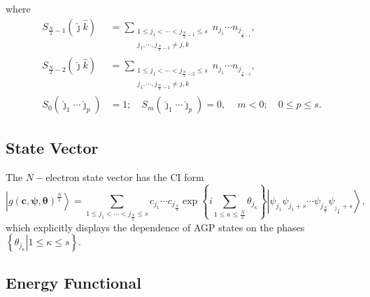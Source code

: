 \documentclass[aps,preprint]{revtex4}%
\begin{document}
where
\begin{align}
S_{\frac{N}{2}-1}\left(  \hat{\jmath}\hat{k}\right)   &  =\sum
_{\substack{1\leq j_{1}<\cdots<j_{\frac{N}{2}-1}\leq s\\j_{1},\cdots
,j_{\frac{N}{2}-1}\neq j,k}}n_{j_{1}}\cdots n_{j_{_{\frac{N}{2}-1}}},\\
S_{\frac{N}{2}-2}\left(  \hat{\jmath}\hat{k}\right)   &  =\sum
_{\substack{1\leq j_{1}<\cdots<j_{\frac{N}{2}-2}\leq s\\j_{1},\cdots
,j_{\frac{N}{2}-1}\neq j,k}}n_{j_{1}}\cdots n_{j_{_{\frac{N}{2}-2}}},\\
S_{0}\left(  \hat{\jmath}_{1}\cdots\hat{\jmath}_{p}\right)   &  =1;\quad
S_{m}\left(  \hat{\jmath}_{1}\cdots\hat{\jmath}_{p}\right)  =0,\,\quad
m<0;\quad0\leq p\leq s.
\end{align}


\subsection{State Vector\label{StateVec}}

The $N-$electron state vector has the CI form
\begin{equation}
\left\vert g\left(  \bm{c,\psi,\theta}\right)  ^{\frac{N}{2}}\right\rangle
=\sum_{1\leq j_{1}<\cdots<j_{\frac{N}{2}}\leq s}c_{j_{1}}\cdots c_{j_{\frac
{N}{2}}}\exp\left\{  i\sum\limits_{1\leq\kappa\leq\frac{N}{2}}\theta
_{j_{\kappa}}\right\}  \left\vert \psi_{j_{1}}\psi_{j_{1}+s}\cdots
\psi_{j_{\frac{N}{2}}}\psi_{_{j_{\frac{N}{2}}}+s}\right\rangle ,
\end{equation}
which explicitly displays the dependence of AGP states on the phases $\left\{
\left.  \theta_{j_{\kappa}}\right\vert 1\leq\kappa\leq s\right\}  $.

\subsection{Energy Functional\label{AGPFunc}}
\end{document}
